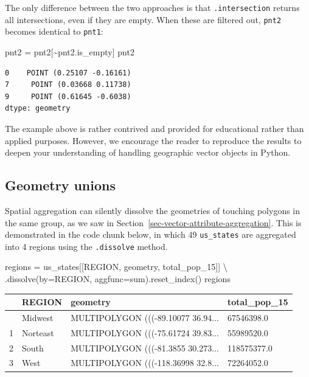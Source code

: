 \documentclass[
  letterpaper,
]{krantz}
\newenvironment{Shaded}{\begin{snugshade}}{\end{snugshade}}
\newcommand{\NormalTok}[1]{\textcolor[rgb]{0.00,0.23,0.31}{#1}}
\newcommand{\OperatorTok}[1]{\textcolor[rgb]{0.37,0.37,0.37}{#1}}
\newcommand{\StringTok}[1]{\textcolor[rgb]{0.13,0.47,0.30}{#1}}
\begin{document}
The only difference between the two approaches is that
\texttt{.intersection} returns all intersections, even if they are
empty. When these are filtered out, \texttt{pnt2} becomes identical to
\texttt{pnt1}:

\begin{Shaded}
\begin{Highlighting}[]
\NormalTok{pnt2 }\OperatorTok{=}\NormalTok{ pnt2[}\OperatorTok{\textasciitilde{}}\NormalTok{pnt2.is\_empty]}
\NormalTok{pnt2}
\end{Highlighting}
\end{Shaded}

\begin{verbatim}
0    POINT (0.25107 -0.16161)
7     POINT (0.03668 0.11738)
9     POINT (0.61645 -0.6038)
dtype: geometry
\end{verbatim}

The example above is rather contrived and provided for educational
rather than applied purposes. However, we encourage the reader to
reproduce the results to deepen your understanding of handling
geographic vector objects in Python.

\subsection{Geometry unions}\label{sec-geometry-unions}

Spatial aggregation can silently dissolve the geometries of touching
polygons in the same group, as we saw in
Section~\ref{sec-vector-attribute-aggregation}. This is demonstrated in
the code chunk below, in which 49 \texttt{us\_states} are aggregated
into 4 regions using the \texttt{.dissolve} method.

\begin{Shaded}
\begin{Highlighting}[]
\NormalTok{regions }\OperatorTok{=}\NormalTok{ us\_states[[}\StringTok{\textquotesingle{}REGION\textquotesingle{}}\NormalTok{, }\StringTok{\textquotesingle{}geometry\textquotesingle{}}\NormalTok{, }\StringTok{\textquotesingle{}total\_pop\_15\textquotesingle{}}\NormalTok{]] }\OperatorTok{\textbackslash{}}
\NormalTok{    .dissolve(by}\OperatorTok{=}\StringTok{\textquotesingle{}REGION\textquotesingle{}}\NormalTok{, aggfunc}\OperatorTok{=}\StringTok{\textquotesingle{}sum\textquotesingle{}}\NormalTok{).reset\_index()}
\NormalTok{regions}
\end{Highlighting}
\end{Shaded}

\begin{longtable}[]{@{}llll@{}}
\toprule\noalign{}
& REGION & geometry & total\_pop\_15 \\
\midrule\noalign{}
\endhead
\bottomrule\noalign{}
\endlastfoot
0 & Midwest & MULTIPOLYGON (((-89.10077 36.94... & 67546398.0 \\
1 & Norteast & MULTIPOLYGON (((-75.61724 39.83... & 55989520.0 \\
2 & South & MULTIPOLYGON (((-81.3855 30.273... & 118575377.0 \\
3 & West & MULTIPOLYGON (((-118.36998 32.8... & 72264052.0 \\
\end{longtable}
\end{document}

